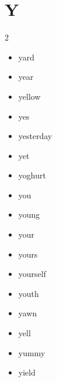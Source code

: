 \documentclass[../../book.tex]{subfiles}
\begin{document}
\section{Y}
\raggedcolumns
\begin{multicols}{2}
\begin{itemize}
\item[-] yard
\item[-] year
\item[-] yellow
\item[-] yes
\item[-] yesterday
\item[-] yet
\item[-] yoghurt
\item[-] you
\item[-] young
\item[-] your
\item[-] yours
\item[-] yourself
\item[-] youth
\item[-] yawn
\item[-] yell
\item[-] yummy
\item[-] yield
\end{itemize}
\end{multicols}
\end{document}
